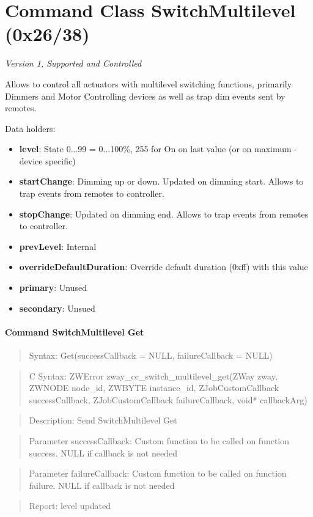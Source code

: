 \section{Command Class SwitchMultilevel (0x26/38)}

\textit{Version 1, Supported and Controlled}
\newline

Allows to control all actuators with multilevel switching functions, primarily Dimmers and Motor Controlling devices as well as trap dim events sent by remotes.
\newline

\noindent
Data holders:

\begin{itemize}
\item \textbf{level}: State 0...99 = 0...100\%, 255 for On on last value (or on maximum - device specific)
\item \textbf{startChange}: Dimming up or down. Updated on dimming start. Allows to trap events from remotes to controller.
\item \textbf{stopChange}: Updated on dimming end. Allows to trap events from remotes to controller.
\item \textbf{prevLevel}: Internal
\item \textbf{overrideDefaultDuration}: Override default duration (0xff) with this value
\item \textbf{primary}: Unused
\item \textbf{secondary}: Unsued
\end{itemize}

\paragraph{Command SwitchMultilevel Get}
\begin{quote}Syntax: Get(successCallback = NULL, failureCallback = NULL)\end{quote}
\begin{quote}C Syntax: ZWError zway\_cc\_switch\_multilevel\_get(ZWay zway, ZWNODE node\_id, ZWBYTE instance\_id, ZJobCustomCallback successCallback, ZJobCustomCallback failureCallback, void* callbackArg)\end{quote}
\begin{quote}Description: Send SwitchMultilevel Get\end{quote}
\begin{quote}Parameter successCallback: Custom function to be called on function success. NULL if callback is not needed\end{quote}
\begin{quote}Parameter failureCallback: Custom function to be called on function failure. NULL if callback is not needed\end{quote}
\begin{quote}Report: level updated\end{quote}


